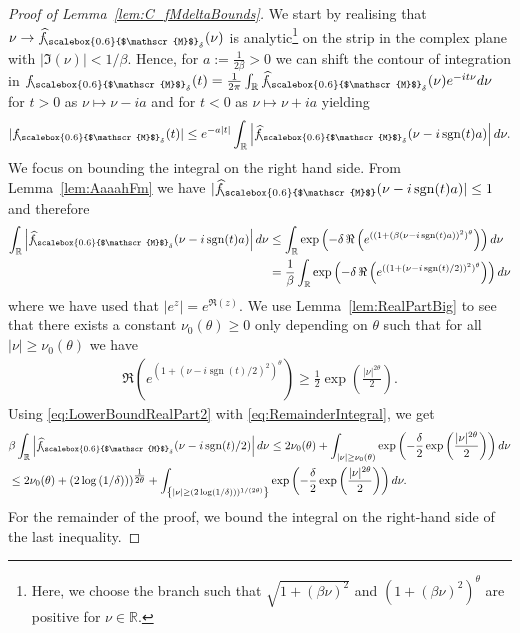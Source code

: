 \documentclass[11pt]{amsart}
\newcommand{\nn}{\nonumber}
\newcommand{\1}{\mathbbm{1}}
\newcommand{\R}{\mathbb{R}}
\newcommand{\hatfM}{\widehat{f}_{\!\scalebox{0.6}{$\mathscr{M}$}}
}
\newcommand{\hatfMdelta}{\widehat{f}_{\!\scalebox{0.6}{$\mathscr{M}$}_\delta}}
\newcommand{\fMdelta}{f_{\!\scalebox{0.6}{$\mathscr{M}$}_\delta}}
\theoremstyle{plain}
\theoremstyle{definition}
\theoremstyle{remark}
\numberwithin{equation}{section}
\begin{document}
\begin{proof} [Proof of Lemma~\ref{lem:C_fMdeltaBounds}]

We start by realising that $\nu\to \hatfMdelta(\nu)$ is analytic\footnote{Here, we choose the branch such that $\sqrt{1+(\beta\nu)^2}$ and $(1+(\beta\nu)^2)^{\theta}$ are positive for $\nu\in\R.$} on the strip in the complex plane with $|\Im(\nu)|<1/\beta.$ Hence, for $a:=\frac{1}{2\beta}>0$ we can shift the contour of integration in $\fMdelta(t) = \frac{1}{2\pi}\int_\R \hatfMdelta(\nu)e^{-it\nu}d\nu$ for $t>0$ as $\nu\mapsto \nu - ia$ and for $t<0$ as $\nu\mapsto \nu+ia$ yielding 
\begin{align}
\label{eq:ExpDecayfMdelta(t)}
    |\fMdelta(t)| \le e^{-a|t|} \int_\R \left|\hatfMdelta(\nu-i\operatorname{sgn}(t) a)\right|d\nu.
\end{align}
We focus on bounding the integral on the right hand side.
From Lemma~\ref{lem:AaaahFm} we have $|\hatfM(\nu-i\operatorname{sgn}(t) a)| \le 1$
and therefore 
\begin{align}
\label{eq:RemainderIntegral}
   \nn \int_\R \left|\hatfMdelta(\nu-i\operatorname{sgn}(t)a)\right|d\nu &\le \int_\R \exp\left(-\delta\,\Re\left(e^{((1+(\beta(\nu-i\operatorname{sgn}(t)a))^2)^\theta}\right)\right)d\nu\\ &=\frac{1}{\beta}\int_\R \exp\left(-\delta\,\Re\left(e^{((1+(\nu-i\operatorname{sgn}(t)/2))^2)^\theta}\right)\right)d\nu
\end{align}
where we have used that $|e^z| = e^{\Re(z)}.$ 
We use Lemma~\ref{lem:RealPartBig} to see that there exists a constant $\nu_0(\theta)\ge 0$ only depending on $\theta$ such that for all $|\nu|\ge \nu_0(\theta)$ we have
\begin{align}
\label{eq:LowerBoundRealPart2}
\Re\left(e^{(1+(\nu-i\operatorname{sgn}(t)/2)^2)^\theta}\right) \ge \frac{1}{2} \exp\left(\frac{|\nu|^{2\theta}}{2}\right).
\end{align}
 Using \eqref{eq:LowerBoundRealPart2} with \eqref{eq:RemainderIntegral}, we get
\begin{align*}
    &\beta\int_\R \left|\hatfMdelta(\nu-i\operatorname{sgn}(t)/2)\right|d\nu \le 2\nu_0(\theta)+ \int_{|\nu|\ge \nu_0(\theta)} \exp\left(-\frac{\delta}{2}\exp\left(\frac{|\nu|^{2\theta}}{2}\right)\right)d\nu\\&\le 2\nu_0(\theta)+ (2\log\left(1/\delta)\right))^{\tfrac{1}{2\theta}} + \int_{\left\{|\nu|\ge (2\log\left(1/\delta)\right))^{1/(2\theta)}\right\}} \exp\left(-\frac{\delta}{2}\exp\left(\frac{|\nu|^{2\theta}}{2}\right)\right)d\nu.
\end{align*}
For the remainder of the proof, we bound the integral on the right-hand side of the last inequality. 


\end{proof}
\end{document}
